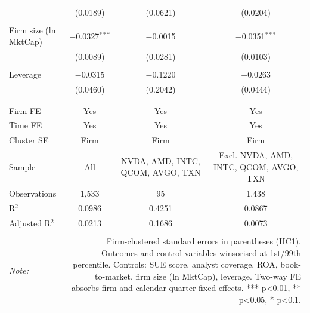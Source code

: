 \begin{table}[!htbp]
\begin{tabular}{@{\extracolsep{5pt}}lccc}
  & (0.0189) & (0.0621) & (0.0204) \\ 
  & & & \\ 
 Firm size (ln MktCap) & $-$0.0327$^{***}$ & $-$0.0015 & $-$0.0351$^{***}$ \\ 
  & (0.0089) & (0.0281) & (0.0103) \\ 
  & & & \\ 
 Leverage & $-$0.0315 & $-$0.1220 & $-$0.0263 \\ 
  & (0.0460) & (0.2042) & (0.0444) \\ 
  & & & \\ 
\hline \\[-1.8ex] 
Firm FE & Yes & Yes & Yes \\ 
Time FE & Yes & Yes & Yes \\ 
Cluster SE & Firm & Firm & Firm \\ 
Sample & All & NVDA, AMD, INTC, QCOM, AVGO, TXN & Excl. NVDA, AMD, INTC, QCOM, AVGO, TXN \\ 
Observations & 1,533 & 95 & 1,438 \\ 
R$^{2}$ & 0.0986 & 0.4251 & 0.0867 \\ 
Adjusted R$^{2}$ & 0.0213 & 0.1686 & 0.0073 \\ 
\hline 
\hline \\[-1.8ex] 
\textit{Note:}  & \multicolumn{3}{r}{Firm-clustered standard errors in parentheses (HC1). Outcomes and control variables winsorised at 1st/99th percentile. Controls: SUE score, analyst coverage, ROA, book-to-market, firm size (ln MktCap), leverage. Two-way FE absorbs firm and calendar-quarter fixed effects. *** p<0.01, ** p<0.05, * p<0.1.} \\ 
\end{tabular} 
\end{table} 
